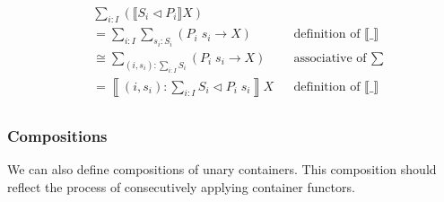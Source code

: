 {\begin{code}%
\>[0]\AgdaSpace{}%
\AgdaSymbol{:}\AgdaSpace{}%
\AgdaSymbol{(}\AgdaSpace{}%
\AgdaSpace{}%
\AgdaSymbol{)}\AgdaSpace{}%
\AgdaSpace{}%
\<%
\\
\>[0]\AgdaSpace{}%
\AgdaSymbol{\{}\AgdaSymbol{\}}\AgdaSpace{}%
\AgdaSpace{}%
\AgdaSymbol{=}\AgdaSpace{}%
\AgdaSymbol{(}\AgdaFunction{Σ[}\AgdaSpace{}%
\AgdaSpace{}%
\AgdaSpace{}%
\AgdaSpace{}%
\AgdaFunction{]}\AgdaSpace{}%
\AgdaSpace{}%
\AgdaSpace{}%
\AgdaSymbol{)}\AgdaSpace{}%
\AgdaSpace{}%
\AgdaSpace{}%
\AgdaSymbol{(}\AgdaSpace{}%
\AgdaOperator{\AgdaInductiveConstructor{,}}\AgdaSpace{}%
\AgdaSymbol{)}\AgdaSpace{}%
\AgdaSpace{}%
\AgdaSpace{}%
\AgdaSpace{}%
\AgdaSpace{}%
\<%
\end{code}

\begin{align*}
& \sum_{i : I} (\llbracket S_i \triangleleft P_i \rrbracket X) \\
&= \sum_{i : I} \sum_{s_i : S_i} (P_i \; s_i \to X) && \text{definition of $\llbracket \_ \rrbracket$} \\
&\cong \sum_{(i , s_i) : \sum_{i : I} S_i} (P_i \; s_i \to X) && \text{associative of $\sum$} \\
&= \left\llbracket (i , s_i) : \sum_{i : I} S_i \triangleleft P_i \; s_i \right\rrbracket X && \text{definition of $\llbracket \_ \rrbracket$} \\
\end{align*}

\subsubsection*{Compositions}

We can also define compositions of unary containers. This composition should reflect the process of consecutively applying container functors.

}
